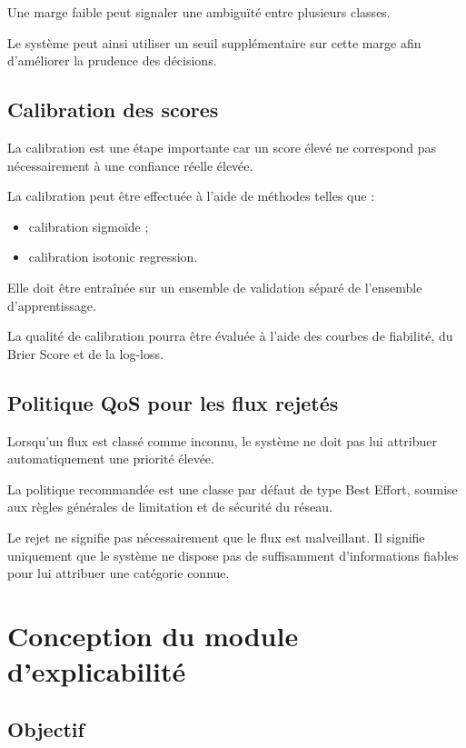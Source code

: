Une marge faible peut signaler une ambiguïté entre
plusieurs classes.

Le système peut ainsi utiliser un seuil supplémentaire
sur cette marge afin d'améliorer la prudence des décisions.

\subsection{Calibration des scores}

La calibration est une étape importante car un score
élevé ne correspond pas nécessairement à une confiance
réelle élevée.

La calibration peut être effectuée à l'aide de méthodes
telles que :

\begin{itemize}
    \item calibration sigmoïde ;
    \item calibration isotonic regression.
\end{itemize}

Elle doit être entraînée sur un ensemble de validation
séparé de l'ensemble d'apprentissage.

La qualité de calibration pourra être évaluée
à l'aide des courbes de fiabilité, du Brier Score
et de la log-loss.

\subsection{Politique QoS pour les flux rejetés}

Lorsqu'un flux est classé comme inconnu, le système
ne doit pas lui attribuer automatiquement une priorité
élevée.

La politique recommandée est une classe par défaut
de type Best Effort, soumise aux règles générales
de limitation et de sécurité du réseau.

Le rejet ne signifie pas nécessairement que le flux
est malveillant. Il signifie uniquement que le système
ne dispose pas de suffisamment d'informations fiables
pour lui attribuer une catégorie connue.

\section{Conception du module d'explicabilité}

\subsection{Objectif}

